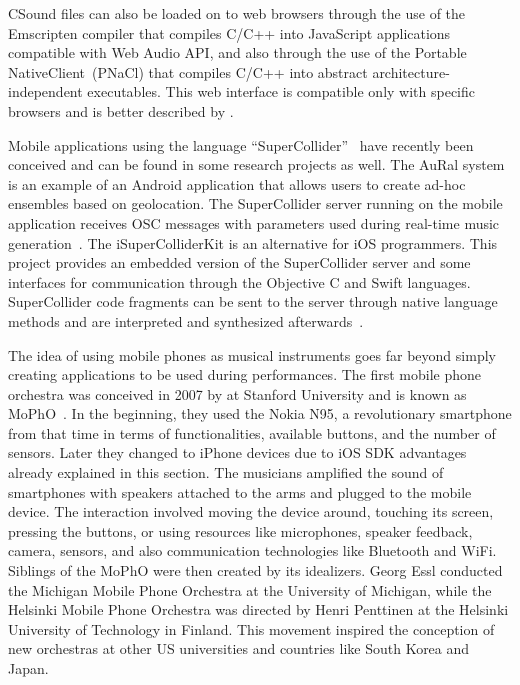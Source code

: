 CSound files can also be loaded on to web browsers through the use of the Emscripten compiler that compiles C/C++ into JavaScript applications compatible with Web Audio API, and also through the use of the Portable NativeClient~(PNaCl) that compiles C/C++ into abstract architecture-independent executables.
This web interface is compatible only with specific browsers and is better described by \cite{lazzarini2014csound}.

Mobile applications using the language ``SuperCollider''~\citep{mccartney2002supercollider} have recently been conceived and can be found in some research projects as well.
The AuRal system is an example of an Android application that allows users to create ad-hoc ensembles based on geolocation.
The SuperCollider server running on the mobile application receives OSC messages with parameters used during real-time music generation~\citep{Allison2012aural}.
The iSuperColliderKit is an alternative for iOS programmers.
This project provides an embedded version of the SuperCollider server and some interfaces for communication through the Objective C and Swift languages.
SuperCollider code fragments can be sent to the server through native language methods and are interpreted and synthesized afterwards~\citep{Ito2015isupercolliderkit}.

The idea of using mobile phones as musical instruments goes far beyond simply creating applications to be used during performances.
The first mobile phone orchestra was conceived in 2007 by  at Stanford University and is known as MoPhO~\citep{Wang2008domobilephones}.
In the beginning, they used the Nokia N95, a revolutionary smartphone from that time in terms of functionalities, available buttons, and the number of sensors.
Later they changed to iPhone devices due to iOS SDK advantages already explained in this section.
The musicians amplified the sound of smartphones with speakers attached to the arms and plugged to the mobile device.
The interaction involved moving the device around, touching its screen, pressing the buttons, or using resources like microphones, speaker feedback, camera, sensors, and also communication technologies like Bluetooth and WiFi.
Siblings of the MoPhO were then created by its idealizers.
Georg Essl conducted the Michigan Mobile Phone Orchestra at the University of Michigan, while the Helsinki Mobile Phone Orchestra was directed by Henri Penttinen at the Helsinki University of Technology in Finland.
This movement inspired the conception of new orchestras at other US universities and countries like South Korea and Japan.

